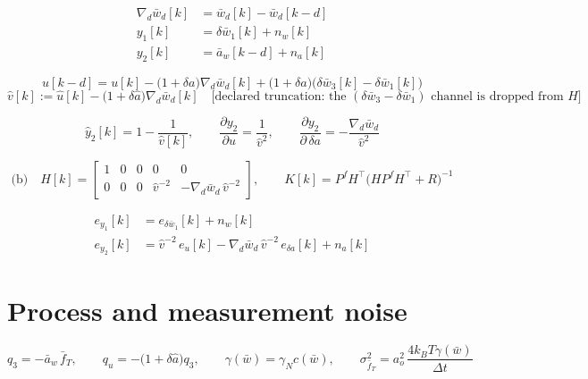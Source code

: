 \documentclass[11pt,a4paper,fontset=none]{ctexart}
\newcommand{\ba}{\bar{a}}
\newcommand{\bw}{\bar{w}}
\begin{document}
\begin{align*}
\nabla_d\bw_d[k] &= \bw_d[k] - \bw_d[k-d] \\
y_1[k] &= \delta\bw_1[k] + n_w[k] \\
y_2[k] &= \ba_w[k-d] + n_a[k]
\end{align*}

\begin{equation*}
u[k-d] = u[k] - \bigl(1+\delta a\bigr)\nabla_d\bw_d[k]
  + \bigl(1+\delta a\bigr)\bigl(\delta\bw_3[k]-\delta\bw_1[k]\bigr)
\end{equation*}
\begin{equation*}
\hat{v}[k] := \hat{u}[k] - \bigl(1+\delta\hat{a}\bigr)\nabla_d\bw_d[k]
\quad
\bigl[\text{declared truncation: the }(\delta\bw_3-\delta\bw_1)
\text{ channel is dropped from } H\bigr]
\end{equation*}

\begin{equation*}
\hat{y}_2[k] = 1 - \frac{1}{\hat{v}[k]},
\qquad
\frac{\partial y_2}{\partial u} = \frac{1}{\hat{v}^{2}},
\qquad
\frac{\partial y_2}{\partial\,\delta a} = -\frac{\nabla_d\bw_d}{\hat{v}^{2}}
\end{equation*}

\begin{equation*}
\text{(b)}\quad
H[k] =
\begin{bmatrix}
1 & 0 & 0 & 0 & 0 \\
0 & 0 & 0 & \hat{v}^{-2} & -\nabla_d\bw_d\,\hat{v}^{-2}
\end{bmatrix},
\qquad
K[k] = P^f H^{\top}\bigl(HP^fH^{\top}+R\bigr)^{-1}
\end{equation*}

\begin{align*}
e_{y_1}[k] &= e_{\delta\bw_1}[k] + n_w[k] \\
e_{y_2}[k] &= \hat{v}^{-2}\,e_u[k]
  - \nabla_d\bw_d\,\hat{v}^{-2}\,e_{\delta a}[k] + n_a[k]
\end{align*}

\section{Process and measurement noise}

\begin{equation*}
q_3 = -\ba_w\,\bar{f}_T,
\qquad
q_u = -\bigl(1+\delta\hat{a}\bigr)q_3,
\qquad
\gamma(\bw) = \gamma_N c(\bw),
\qquad
\sigma^{2}_{\bar{f}_T} = a_o^{2}\,\frac{4k_BT\gamma(\bw)}{\Delta t}
\end{equation*}
\end{document}
